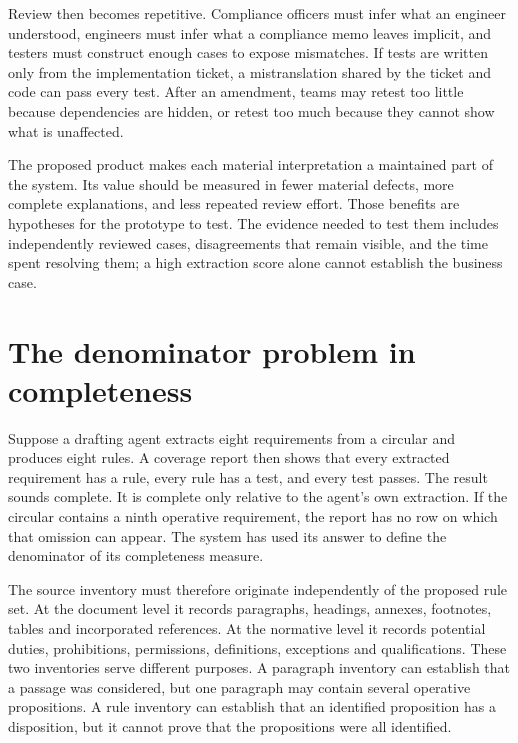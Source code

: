 Review then becomes repetitive. Compliance officers must infer what an engineer
understood, engineers must infer what a compliance memo leaves implicit, and
testers must construct enough cases to expose mismatches. If tests are written
only from the implementation ticket, a mistranslation shared by the ticket and
code can pass every test. After an amendment, teams may retest too little because
dependencies are hidden, or retest too much because they cannot show what is
unaffected.


The proposed product makes each material interpretation a maintained part of the
system. Its value should be measured in fewer material defects, more complete
explanations, and less repeated review effort. Those benefits are hypotheses for
the prototype to test. The evidence needed to test them includes independently
reviewed cases, disagreements that remain visible, and the time spent resolving
them; a high extraction score alone cannot establish the business case.

\section{The denominator problem in completeness}
\label{merge:M01:03}

\label{sec:problem-denominator}
Suppose a drafting agent extracts eight requirements from a circular and produces
eight rules. A coverage report then shows that every extracted requirement has a
rule, every rule has a test, and every test passes. The result sounds complete.
It is complete only relative to the agent's own extraction. If the circular
contains a ninth operative requirement, the report has no row on which that
omission can appear. The system has used its answer to define the denominator
of its completeness measure.

The source inventory must therefore originate independently of the proposed
rule set. At the document level it records paragraphs, headings, annexes,
footnotes, tables and incorporated references. At the normative level it records
potential duties, prohibitions, permissions, definitions, exceptions and
qualifications. These two inventories serve different purposes. A paragraph
inventory can establish that a passage was considered, but one paragraph may
contain several operative propositions. A rule inventory can establish that an
identified proposition has a disposition, but it cannot prove that the
propositions were all identified.


